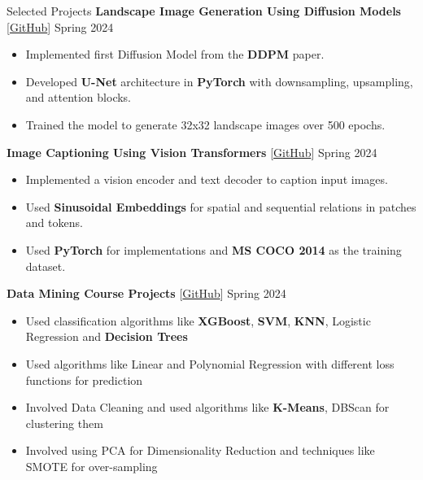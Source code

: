 \documentclass{resume}
\begin{document}
\begin{rSection}{Selected Projects}
    {\bf Landscape Image Generation Using Diffusion Models} [\href{https://github.com/SepehrNoey/Landscape-Image-Generation-Using-Diffusion-Models}{GitHub}] \hspace{8em} {Spring 2024}
    \vspace{-1.6em}
    \begin{itemize}[topsep=0pt, leftmargin=1em, label=$\circ$]
        \item Implemented first Diffusion Model from the {\bf DDPM} paper.
        \item Developed {\bf U-Net} architecture in {\bf PyTorch} with downsampling, upsampling, and attention blocks.
        \item Trained the model to generate 32x32 landscape images over 500 epochs.
    \end{itemize}

    \newpage

    {\bf Image Captioning Using Vision Transformers} [\href{https://github.com/SepehrNoey/Image-Captioning-Using-Vision-Transformers}{GitHub}] \hspace{12em} {Spring 2024}
    \vspace{-1.6em}
    \begin{itemize}[topsep=0pt, leftmargin=1em, label=$\circ$]
        \item Implemented a vision encoder and text decoder to caption input images.
        \item Used {\bf Sinusoidal Embeddings} for spatial and sequential relations in patches and tokens.
        \item Used {\bf PyTorch} for implementations and {\bf MS COCO 2014} as the training dataset.
    \end{itemize}

    {\bf Data Mining Course Projects} [\href{https://github.com/SepehrNoey/Data-Mining}{GitHub}] \hspace{18em} {Spring 2024}
    \vspace{-1.6em}
    \begin{itemize}[topsep=0pt, leftmargin=1em, label=$\circ$]
        \item Used classification algorithms like {\bf XGBoost}, {\bf SVM}, {\bf KNN}, Logistic Regression and {\bf Decision Trees}
        \item Used algorithms like Linear and Polynomial Regression with different loss functions for prediction
        \item Involved Data Cleaning and used algorithms like {\bf K-Means}, DBScan for clustering them
        \item Involved using PCA for Dimensionality Reduction and techniques like SMOTE for over-sampling 
    \end{itemize}


\end{rSection}
\end{document}
